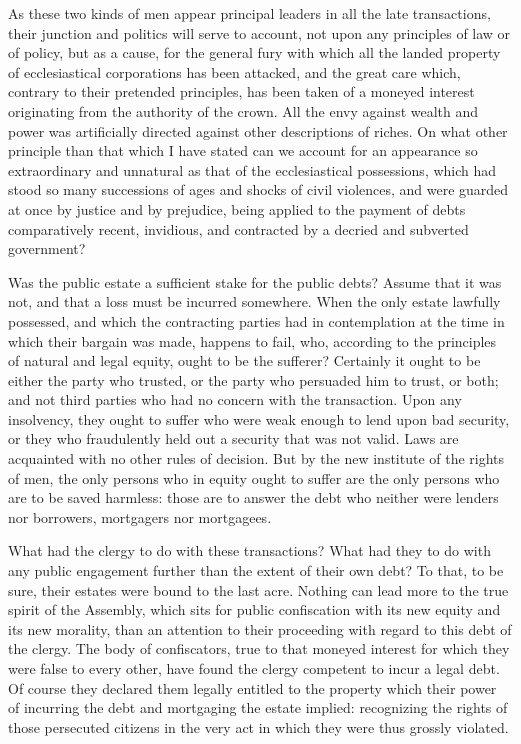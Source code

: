 As these two kinds of men appear principal leaders in all the late transactions, their junction and politics will serve to account, not upon any principles of law or of policy, but as a cause, for the general fury with which all the landed property of ecclesiastical corporations has been attacked, and the great care which, contrary to their pretended principles, has been taken of a moneyed interest originating from the authority of the crown. All the envy against wealth and power was artificially directed against other descriptions of riches. On what other principle than that which I have stated can we account for an appearance so extraordinary and unnatural as that of the ecclesiastical possessions, which had stood so many successions of ages and shocks of civil violences, and were guarded at once by justice and by prejudice, being applied to the payment of debts comparatively recent, invidious, and contracted by a decried and subverted government?

Was the public estate a sufficient stake for the public debts? Assume that it was not, and that a loss must be incurred somewhere. When the only estate lawfully possessed, and which the contracting parties had in contemplation at the time in which their bargain was made, happens to fail, who, according to the principles of natural and legal equity, ought to be the sufferer? Certainly it ought to be either the party who trusted, or the party who persuaded him to trust, or both; and not third parties who had no concern with the transaction. Upon any insolvency, they ought to suffer who were weak enough to lend upon bad security, or they who fraudulently held out a security that was not valid. Laws are acquainted with no other rules of decision. But by the new institute of the rights of men, the only persons who in equity ought to suffer are the only persons who are to be saved harmless: those are to answer the debt who neither were lenders nor borrowers, mortgagers nor mortgagees.

What had the clergy to do with these transactions? What had they to do with any public engagement further than the extent of their own debt? To that, to be sure, their estates were bound to the last acre. Nothing can lead more to the true spirit of the Assembly, which sits for public confiscation with its new equity and its new morality, than an attention to their proceeding with regard to this debt of the clergy. The body of confiscators, true to that moneyed interest for which they were false to every other, have found the clergy competent to incur a legal debt. Of course they declared them legally entitled to the property which their power of incurring the debt and mortgaging the estate implied: recognizing the rights of those persecuted citizens in the very act in which they were thus grossly violated.


